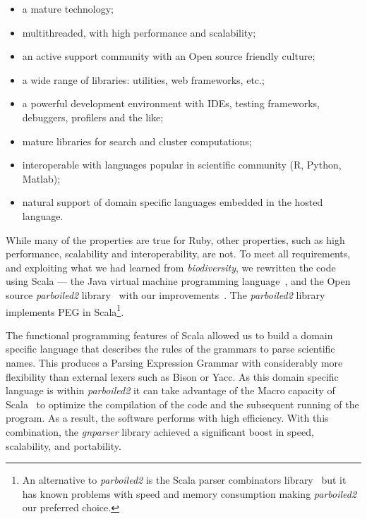 \documentclass{bmcart}
\begin{document}
\begin{itemize}

    \item a mature technology;

    \item multithreaded, with high performance and scalability;

    \item an active support community with an Open source friendly culture;

    \item a wide range of libraries: utilities, web frameworks, etc.;

    \item a powerful development environment with IDEs, testing frameworks, debuggers, profilers and the like;

    \item mature libraries for search and cluster computations;

    \item interoperable with languages popular in scientific community (R, Python, Matlab);

    \item natural support of domain specific languages embedded in the hosted language.

\end{itemize}

While many of the properties are true for Ruby, other properties, such as high performance, scalability and interoperability, are not. To meet all requirements, and exploiting what we had learned from \textit{biodiversity}, we rewritten the code using Scala --- the Java virtual machine programming language~\cite{odersky2004overview}, and the Open source \textit{parboiled2} library~\cite{parboiled2, Myltsev:inpress-a} with our improvements~\cite{parboiled2-gna}. The \textit{parboiled2} library implements PEG in Scala\footnote{An alternative to \textit{parboiled2} is the Scala parser combinators library~\cite{moors2008parser} but it has known problems with speed and memory consumption making \textit{parboiled2} our preferred choice.}.

The functional programming features of Scala allowed us to build a domain specific language that describes the rules of the grammars to parse scientific names. This produces a Parsing Expression Grammar with considerably more flexibility than external lexers such as Bison or Yacc. As this domain specific language is within \textit{parboiled2} it can take advantage of the Macro capacity of Scala~\cite{Burmako:2013:SML:2489837.2489840} to optimize the compilation of the code and the subsequent running of the program. As a result, the software performs with high efficiency. With this combination, the \textit{gnparser} library achieved a significant boost in speed, scalability, and portability.
\end{document}

